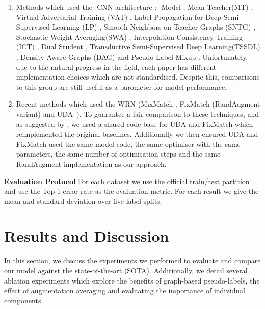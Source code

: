 \documentclass[journal]{IEEEtran}
\begin{document}
\begin{enumerate}
    \item Methods which used the -CNN architecture \cite{tarvainen2017mean}: -Model \cite{laine2016temporal}, Mean Teacher(MT) \cite{tarvainen2017mean}, Virtual Adversarial Training (VAT) \cite{miyato2018virtual}, Label Propagation for Deep Semi-Supervised Learning (LP) \cite{iscen2019label}, Smooth Neighbors on Teacher Graphs (SNTG) \cite{luo2018smooth}, Stochastic Weight Averaging(SWA) \cite{athiwaratkun2018there}, Interpolation Consistency Training (ICT) \cite{verma2019interpolation}, Dual Student \cite{ke2019dual},  Transductive Semi-Supervised Deep Learning(TSSDL) \cite{shi2018transductive}, Density-Aware Graphs (DAG)  \cite{li2020density} and Pseudo-Label Mixup \cite{arazo2019pseudo}. Unfortunately, due to the natural progress in the field, each paper has different implementation choices which are not standardised. Despite this, comparisons to this group are still useful as a barometer for model performance. 
    \item Recent methods which used the WRN \cite{wideresidual} (MixMatch \cite{berthelot2019mixmatch}, FixMatch (RandAugment variant) \cite{sohn2020fixmatch} and UDA~\cite{xie2019unsupervised}). To guarantee a fair comparison to these techniques, and as suggested by \cite{realisticssl}, we used a shared code-base for UDA and FixMatch which reimplemented the original baselines. Additionally we then ensured UDA and FixMatch used the same model code, the same optimiser with the same parameters, the same number of optimisation steps and the same RandAugment implementation as our approach.
\end{enumerate}


\textbf{Evaluation Protocol} For each dataset we use the official train/test partition and use the Top-1 error rate as the evaluation metric. For each result we give the mean and standard deviation over five label splits.



\section{Results and Discussion}

In this section, we discuss the experiments we performed to evaluate and compare our model against the state-of-the-art (SOTA). Additionally, we detail several ablation experiments which explore the benefits of graph-based pseudo-labels, the effect of augmentation averaging and evaluating the importance of individual components.
\end{document}
